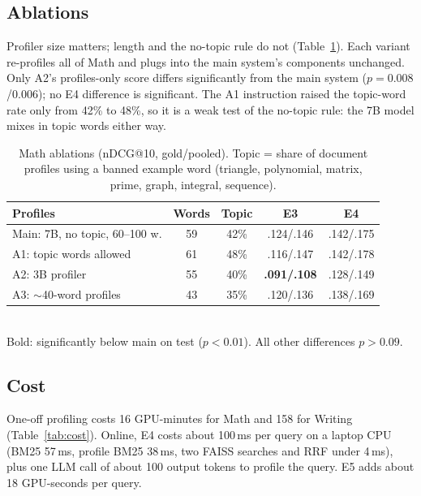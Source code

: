 \documentclass[conference]{IEEEtran}
\begin{document}
\subsection{Ablations}
Profiler size matters; length and the no-topic rule do not (Table~\ref{tab:abl}). Each variant re-profiles all of Math and plugs into the main system's components unchanged. Only A2's profiles-only score differs significantly from the main system ($p=0.008$/$0.006$); no E4 difference is significant. The A1 instruction raised the topic-word rate only from 42\% to 48\%, so it is a weak test of the no-topic rule: the 7B model mixes in topic words either way.

\begin{table}[t]
\centering
\caption{Math ablations (nDCG@10, gold/pooled). Topic = share of document profiles using a banned example word (triangle, polynomial, matrix, prime, graph, integral, sequence).}
\label{tab:abl}
\footnotesize
\begin{tabular}{@{}lcccc@{}}
\toprule
Profiles & Words & Topic & E3 & E4 \\
\midrule
Main: 7B, no topic, 60--100 w. & 59 & 42\% & .124/.146 & .142/.175 \\
A1: topic words allowed & 61 & 48\% & .116/.147 & .142/.178 \\
A2: 3B profiler & 55 & 40\% & \textbf{.091/.108} & .128/.149 \\
A3: $\sim$40-word profiles & 43 & 35\% & .120/.136 & .138/.169 \\
\bottomrule
\end{tabular}
\\[2pt]{\scriptsize Bold: significantly below main on test ($p<0.01$). All other differences $p>0.09$.}
\end{table}

\subsection{Cost}
One-off profiling costs 16 GPU-minutes for Math and 158 for Writing (Table~\ref{tab:cost}). Online, E4 costs about 100\,ms per query on a laptop CPU (BM25 57\,ms, profile BM25 38\,ms, two FAISS searches and RRF under 4\,ms), plus one LLM call of about 100 output tokens to profile the query. E5 adds about 18 GPU-seconds per query.
\end{document}
